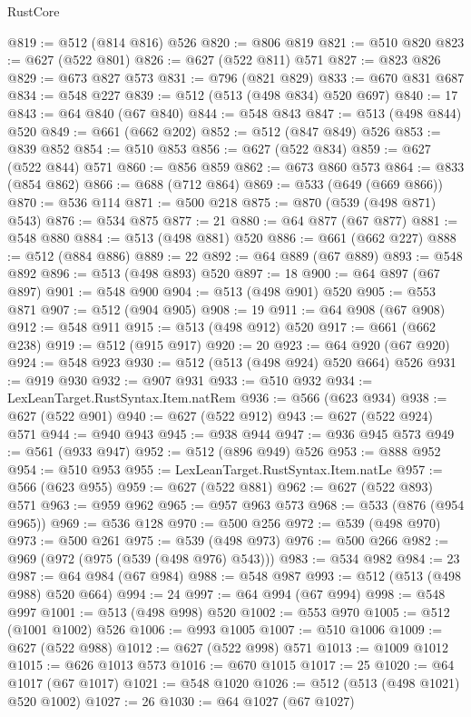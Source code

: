 \begin{lexlean}{RustCore}
\begin{coremodule}
@819 := @512 (@814 @816) @526
@820 := @806 @819
@821 := @510 @820
@823 := @627 (@522 @801)
@826 := @627 (@522 @811) @571
@827 := @823 @826
@829 := @673 @827 @573
@831 := @796 (@821 @829)
@833 := @670 @831 @687
@834 := @548 @227
@839 := @512 (@513 (@498 @834) @520 @697)
@840 := 17
@843 := @64 @840 (@67 @840)
@844 := @548 @843
@847 := @513 (@498 @844) @520
@849 := @661 (@662 @202)
@852 := @512 (@847 @849) @526
@853 := @839 @852
@854 := @510 @853
@856 := @627 (@522 @834)
@859 := @627 (@522 @844) @571
@860 := @856 @859
@862 := @673 @860 @573
@864 := @833 (@854 @862)
@866 := @688 (@712 @864)
@869 := @533 (@649 (@669 @866))
@870 := @536 @114
@871 := @500 @218
@875 := @870 (@539 (@498 @871) @543)
@876 := @534 @875
@877 := 21
@880 := @64 @877 (@67 @877)
@881 := @548 @880
@884 := @513 (@498 @881) @520
@886 := @661 (@662 @227)
@888 := @512 (@884 @886)
@889 := 22
@892 := @64 @889 (@67 @889)
@893 := @548 @892
@896 := @513 (@498 @893) @520
@897 := 18
@900 := @64 @897 (@67 @897)
@901 := @548 @900
@904 := @513 (@498 @901) @520
@905 := @553 @871
@907 := @512 (@904 @905)
@908 := 19
@911 := @64 @908 (@67 @908)
@912 := @548 @911
@915 := @513 (@498 @912) @520
@917 := @661 (@662 @238)
@919 := @512 (@915 @917)
@920 := 20
@923 := @64 @920 (@67 @920)
@924 := @548 @923
@930 := @512 (@513 (@498 @924) @520 @664) @526
@931 := @919 @930
@932 := @907 @931
@933 := @510 @932
@934 := LexLeanTarget.RustSyntax.Item.natRem
@936 := @566 (@623 @934)
@938 := @627 (@522 @901)
@940 := @627 (@522 @912)
@943 := @627 (@522 @924) @571
@944 := @940 @943
@945 := @938 @944
@947 := @936 @945 @573
@949 := @561 (@933 @947)
@952 := @512 (@896 @949) @526
@953 := @888 @952
@954 := @510 @953
@955 := LexLeanTarget.RustSyntax.Item.natLe
@957 := @566 (@623 @955)
@959 := @627 (@522 @881)
@962 := @627 (@522 @893) @571
@963 := @959 @962
@965 := @957 @963 @573
@968 := @533 (@876 (@954 @965))
@969 := @536 @128
@970 := @500 @256
@972 := @539 (@498 @970)
@973 := @500 @261
@975 := @539 (@498 @973)
@976 := @500 @266
@982 := @969 (@972 (@975 (@539 (@498 @976) @543)))
@983 := @534 @982
@984 := 23
@987 := @64 @984 (@67 @984)
@988 := @548 @987
@993 := @512 (@513 (@498 @988) @520 @664)
@994 := 24
@997 := @64 @994 (@67 @994)
@998 := @548 @997
@1001 := @513 (@498 @998) @520
@1002 := @553 @970
@1005 := @512 (@1001 @1002) @526
@1006 := @993 @1005
@1007 := @510 @1006
@1009 := @627 (@522 @988)
@1012 := @627 (@522 @998) @571
@1013 := @1009 @1012
@1015 := @626 @1013 @573
@1016 := @670 @1015
@1017 := 25
@1020 := @64 @1017 (@67 @1017)
@1021 := @548 @1020
@1026 := @512 (@513 (@498 @1021) @520 @1002)
@1027 := 26
@1030 := @64 @1027 (@67 @1027)

\end{coremodule}
\end{lexlean}

